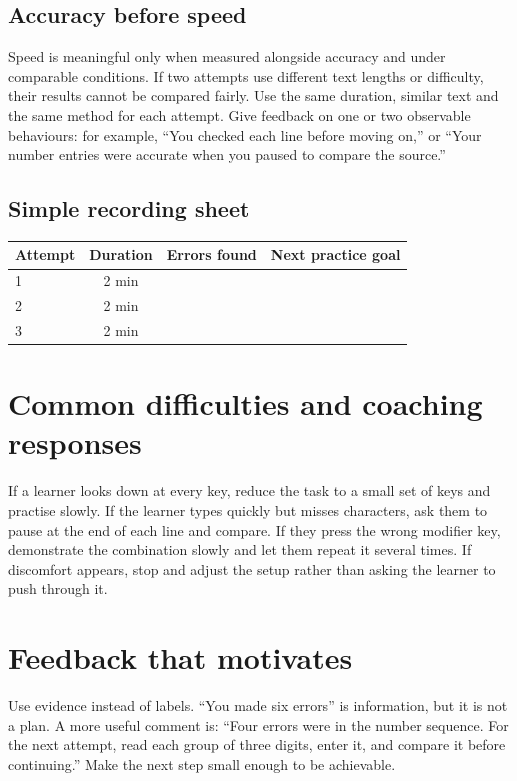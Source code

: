 \documentclass[11pt,openany,oneside]{book}
\begin{document}
\subsection{Accuracy before speed}
Speed is meaningful only when measured alongside accuracy and under comparable conditions. If two attempts use different text lengths or difficulty, their results cannot be compared fairly. Use the same duration, similar text and the same method for each attempt. Give feedback on one or two observable behaviours: for example, “You checked each line before moving on,” or “Your number entries were accurate when you paused to compare the source.”
\subsection{Simple recording sheet}
\begin{center}\small\begin{tabularx}{\textwidth}{|X|c|c|X|}\hline
\textbf{Attempt} & \textbf{Duration} & \textbf{Errors found} & \textbf{Next practice goal}\\\hline
1 & 2 min & & \\\hline
2 & 2 min & & \\\hline
3 & 2 min & & \\\hline
\end{tabularx}\end{center}
\section{Common difficulties and coaching responses}
If a learner looks down at every key, reduce the task to a small set of keys and practise slowly. If the learner types quickly but misses characters, ask them to pause at the end of each line and compare. If they press the wrong modifier key, demonstrate the combination slowly and let them repeat it several times. If discomfort appears, stop and adjust the setup rather than asking the learner to push through it.

\section{Feedback that motivates}
Use evidence instead of labels. “You made six errors” is information, but it is not a plan. A more useful comment is: “Four errors were in the number sequence. For the next attempt, read each group of three digits, enter it, and compare it before continuing.” Make the next step small enough to be achievable.
\end{document}
